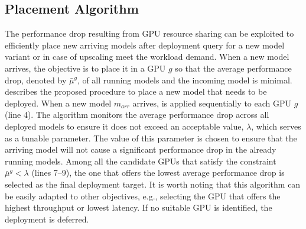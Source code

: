 \subsection{Placement Algorithm}

The performance drop resulting from GPU resource sharing can be exploited to efficiently place new arriving models after deployment query for a new model variant or in case of upscaling meet the workload demand.
When a new model arrives, the objective is to place it in a GPU $g$ so that the average performance drop, denoted by $\bar{\mu}^g$, of all running models and the incoming model is minimal.  describes the proposed procedure to place a new model that needs to be deployed. When a new model $m_{arr}$ arrives,  is applied sequentially to each GPU $g$ (line 4). The algorithm monitors the average performance drop across all deployed models to ensure it does not exceed an acceptable value, $\lambda$, which serves as a tunable parameter. The value of this parameter is chosen to ensure that the arriving model will not cause a significant performance drop in the already running models. Among all the candidate GPUs that satisfy the constraint $\bar{\mu}^g < \lambda$ (lines 7--9), the one that offers the lowest average performance drop is selected as the final deployment target. It is worth noting that this algorithm can be easily adapted to other objectives, e.g., selecting the GPU that offers the highest throughput or lowest latency. If no suitable GPU is identified, the deployment is deferred.



